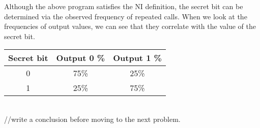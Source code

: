 \begin{comment}
Here is a table for all possible ways an execution of above function could go:\\

\begin{tabular}{| c | c | c | c | c |}
	\hline
	 & Secret Bit & First Random Bit & Output & Noninterfering Execution \\
	\hline
	a &	0 & 0 & 0 & d \\
	\hline
	b &	0 & 0 & 1 & e \\
	\hline
	c &	0 & 1 & 0 & d \\
	\hline
	\hline
	d &	1 & 0 & 0 & a \\
	\hline
	e &	1 & 0 & 1 & b \\
	\hline
	f &	1 & 1 & 1 & b \\
	\hline
\end{tabular}\\

For each state and an execution from it, there is a corresponding execution from each related state with same return value. If a related state has same secret bit value, first execution is also the second execution. If a related state has opposite secret bit value, then corresponding execution is given in the above table. This demonstrates how given code snippet satisfies NI.
\end{comment}

Although the above program satisfies the NI definition, the secret bit can be determined via the observed frequency of repeated calls. When we look at the frequencies of output values, we can see that they correlate with the value of the secret bit.\\

\begin{tabular}{| c | c | c |}
	\hline
	Secret bit & Output 0 \% & Output 1 \% \\
	\hline
	0 &	75\% & 25\% \\
	\hline
	1 &	25\% & 75\% \\
	\hline
\end{tabular}\\

//write a conclusion before moving to the next problem.





